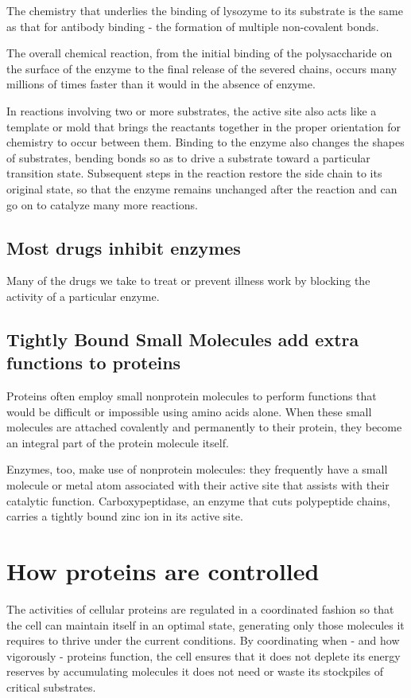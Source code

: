 The chemistry that underlies the binding of lysozyme to its substrate is
the same as that for antibody binding - the formation of multiple non-covalent bonds.

The overall chemical reaction, from the initial binding of the polysaccharide 
on the surface of the enzyme to the final release of the severed
chains, occurs many millions of times faster than it would in the absence
of enzyme.

In reactions involving two or more
substrates, the active site also acts like a template or mold that brings
the reactants together in the proper orientation for chemistry to occur between them.
Binding to the enzyme also changes the shapes of substrates, 
bending bonds so as to drive a substrate toward a particular
transition state. Subsequent
steps in the reaction restore the side chain to its original state, so that the
enzyme remains unchanged after the reaction and can go on to catalyze
many more reactions.

\subsection{Most drugs inhibit enzymes}

Many of the drugs we take to treat or prevent illness work by blocking
the activity of a particular enzyme.


\subsection{Tightly Bound Small Molecules add extra functions to proteins}

Proteins often employ small nonprotein molecules to perform functions that would be
difficult or impossible using amino acids alone. When these small molecules are attached covalently and permanently
to their protein, they become an integral part of the protein molecule
itself.

Enzymes, too, make use of nonprotein molecules: they frequently have
a small molecule or metal atom associated with their active site that
assists with their catalytic function. Carboxypeptidase, an enzyme that
cuts polypeptide chains, carries a tightly bound zinc ion in its active site.

\section{How proteins are controlled}

The activities of cellular proteins are regulated in
a coordinated fashion so that the cell can maintain itself in an optimal
state, generating only those molecules it requires to thrive under the current conditions. 
By coordinating when - and how vigorously - proteins
function, the cell ensures that it does not deplete its energy reserves by
accumulating molecules it does not need or waste its stockpiles of critical substrates.

